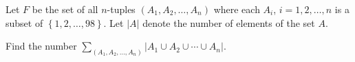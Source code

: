 Let $F$ be the set of all $n$-tuples $\left(A_1,A_2,\ldots,A_n\right)$ where each $A_i$, $i=1,2,\ldots,n$ is a subset of $\left\{1,2,\ldots,98\right\}$. Let $\left|A\right|$ denote the number of elements of the set $A$.

Find the number $\displaystyle\sum_{\left(A_1,A_2,\ldots,A_n\right)}\left|A_1\cup A_2\cup\cdots\cup A_n\right|$.
